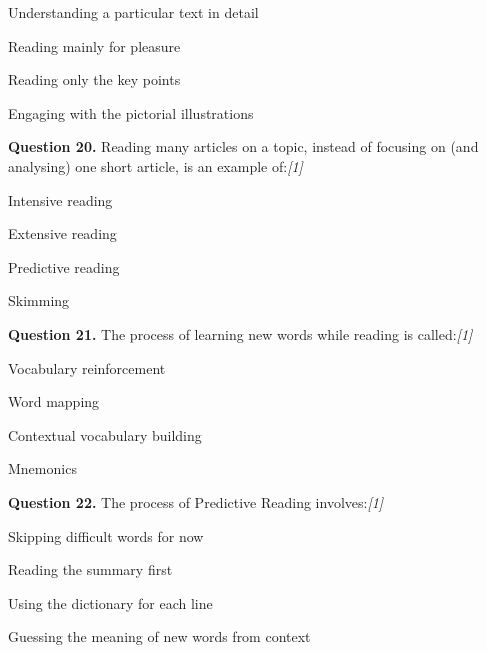 \documentclass[11pt,a4paper]{article}
\newcommand{\pts}[1]{\hfill \textit{[#1]}}
\begin{document}
\begin{parts}
  \item Understanding a particular text in detail
  \item Reading mainly for pleasure
  \item Reading only the key points
  \item Engaging with the pictorial illustrations
\end{parts}

\medskip




\noindent \textbf{Question 20.} Reading many articles on a topic, instead of focusing on (and analysing) one short article, is an example of:\pts{1}

\begin{parts}
  \item Intensive reading
  \item Extensive reading
  \item Predictive reading
  \item Skimming
\end{parts}

\medskip




\noindent \textbf{Question 21.} The process of learning new words while reading is called:\pts{1}

\begin{parts}
  \item Vocabulary reinforcement
  \item Word mapping
  \item Contextual vocabulary building
  \item Mnemonics
\end{parts}

\medskip




\noindent \textbf{Question 22.} The process of Predictive Reading involves:\pts{1}

\begin{parts}
  \item Skipping difficult words for now
  \item Reading the summary first
  \item Using the dictionary for each line
  \item Guessing the meaning of new words from context
\end{parts}

\medskip
\end{document}
